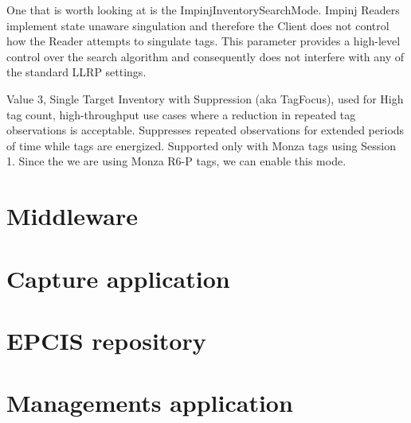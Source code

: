 One that is worth looking at is the ImpinjInventorySearchMode.
Impinj Readers implement state unaware singulation and therefore the Client does not control how the Reader attempts to singulate tags. This parameter provides a high-level control over the search algorithm and consequently does not interfere with any of the standard LLRP settings.~\cite[sec. 4.3.3]{ImpinjOctaneLLRP}

Value 3, Single Target Inventory with Suppression (aka TagFocus), used for High tag count, high-throughput use cases where a reduction in repeated tag observations is acceptable. Suppresses repeated observations for extended periods of time while tags are energized. Supported only with Monza tags using Session 1. Since the we are using Monza R6-P tags, we can enable this mode.

\section{Middleware}

\section{Capture application}

\section{EPCIS repository}

\section{Managements application}